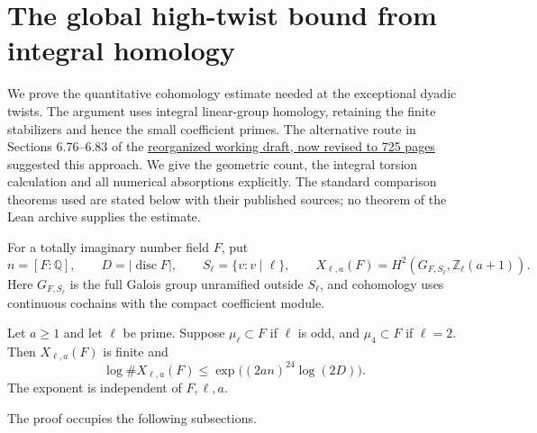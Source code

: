 \section{The global high-twist bound from integral homology}
\label{sec:sr-global-cohomology}
We prove the quantitative cohomology estimate needed at the exceptional
dyadic twists. The argument uses integral linear-group homology, retaining
the finite stabilizers and hence the small coefficient primes.
The alternative route in Sections 6.76--6.83 of the
\href{https://principia-math.com/api/ws/files/1ef7d144fa8b6175858552f76ae0c0d5}{reorganized working draft, now revised to 725 pages}
suggested this approach. We give the geometric count, the integral
torsion calculation and all numerical absorptions explicitly.
The standard comparison theorems used are stated below with their
published sources; no theorem of the Lean archive supplies the estimate.

For a totally imaginary number field \(F\), put
\[
 n=[F:\mathbb Q],\qquad D=|\operatorname{disc}F|,\qquad
 S_\ell=\{v:v\mid\ell\},\qquad
 X_{\ell,a}(F)=H^2(G_{F,S_\ell},\mathbb Z_\ell(a+1)).
\]
Here \(G_{F,S_\ell}\) is the full Galois group unramified outside
\(S_\ell\), and cohomology uses continuous cochains with the compact
coefficient module.

\begin{srtheorem}\label{thm:sr-global-high-twist}
Let \(a\geq1\) and let \(\ell\) be prime.
Suppose \(\mu_\ell\subset F\) if \(\ell\) is odd, and
\(\mu_4\subset F\) if \(\ell=2\).
Then \(X_{\ell,a}(F)\) is finite and
\begin{equation}\label{eq:sr-global-high-twist}
 \log\#X_{\ell,a}(F)
       \leq \exp\bigl((2an)^{24}\log(2D)\bigr).
\end{equation}
The exponent is independent of \(F,\ell,a\).
\end{srtheorem}
The proof occupies the following subsections.

